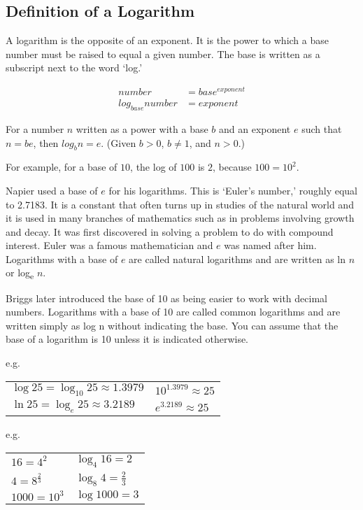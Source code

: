 \documentclass{article}
\begin{document}
\subsection{Definition of a Logarithm}
A logarithm is the opposite of an exponent. It is the power to which a base number must be raised to equal a given number. The base is written as a subscript next to the word ‘log.’

\begin{Large}
\begin{align*}
number &= base^{exponent}\\
log_{base} number &= exponent
\end{align*}
\end{Large}

For a number $n$ written as a power with a base $b$ and an exponent $e$ such that $n = be$, then $log_b n = e$. (Given $b>0$, $b\neq1$, and $n>0$.)

For example, for a base of $10$, the log of $100$ is $2$, because $100 = 10^2$.

Napier used a base of $e$ for his logarithms. This is ‘Euler’s number,’ roughly equal to 2.7183. It is a constant that often turns up in studies of the natural world and it is used in many branches of mathematics such as in problems involving growth and decay. It was first discovered in solving a problem to do with compound interest. Euler was a famous mathematician and $e$ was named after him. Logarithms with a base of $e$ are called natural logarithms and are written as ln $n$ or log\textsubscript{e} $n$.

Briggs later introduced the base of 10 as being easier to work with decimal numbers. Logarithms with a base of 10 are called common logarithms and are written simply as log n without indicating the base. You can assume that the base of a logarithm is 10 unless it is indicated otherwise.

\begin{center}
e.g.
\begin{tabular}{ l l }
$\log{25}=\log_{10}25\approx1.3979$ & $10^{1.3979}\approx25$\\
$\ln 25=\log_{e}25\approx3.2189$ & $e^{3.2189}\approx25$\\
\end{tabular}
\end{center}

\begin{center}
e.g.
\begin{tabular}{ l l }
$16 = 4^2$ & $\log_4{16}=2$\\
$4 = 8^{\frac{2}{3}}$ & $\log_8{4}=\frac{2}{3}$\\
$1000 = 10^3$ & $\log{1000}=3$
\end{tabular}
\end{center}
\end{document}
